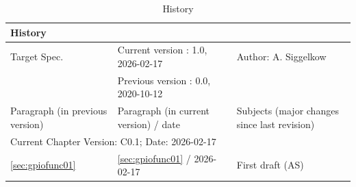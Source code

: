 \begin{table}[H]
\caption{History}
\label{tab:qspihistory02}
\centering
\begin{tabularx}{\textwidth}{|X |X |X |}
  \hline
  \multicolumn{3}{|l|}{History} \\
  \hline
  \multicolumn{1}{|l}{Target Spec.} & \multicolumn{1}{l}{Current version : 1.0, 2026-02-17} & \multicolumn{1}{l|}{Author: A. Siggelkow}\\
  \multicolumn{1}{|l}{ } & \multicolumn{1}{l}{Previous version : 0.0, 2020-10-12} & \multicolumn{1}{l|}{ }\\
  \hline
  \hline
  Paragraph (in previous version) & Paragraph (in current version) / date & Subjects (major changes since last revision) \\
  \hline
  \hline
  \multicolumn{3}{|l|}{Current Chapter Version: C0.1; Date: 2026-02-17} \\
  \hline
  \ref{sec:gpiofunc01} & \ref{sec:gpiofunc01} / 2026-02-17 & First draft (AS) \\
  \hline
\end{tabularx}
\end{table}
